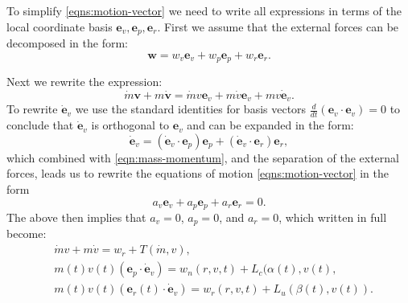\documentclass{article}
\renewcommand{\vec}[1]{\boldsymbol{#1}}
\begin{document}
To simplify \eqref{eqns:motion-vector} we need to write all expressions in terms of the local coordinate basis $\vec e_v, \vec e_p, \vec e_r$. First we assume that the external forces can be decomposed in the form:
\[
\vec w = w_v \vec e_v + w_p \vec e_p + w_r \vec e_r.
\]

Next we rewrite the expression:
\begin{equation} \label{eqn:mass-momentum}
    \dot{m}\vec{v} + m \dot{\vec{v}} = \dot{m}v \vec{e}_v + m \dot v \vec{e}_v + m v \dot{\vec{e}}_v.
\end{equation}
To rewrite $\dot{\vec{e}}_v$ we use the standard identities for basis vectors $\frac{d}{dt}(\vec{e}_v \cdot \vec{e}_v)=0$
to conclude that $\dot{\vec{e}}_v$ is orthogonal to ${\vec{e}}_v$ and can be expanded in the form:
\[
\dot{\vec{e}}_v =  (\dot{\vec{e}}_v \cdot \vec{e}_p)\vec{e}_p + (\dot{\vec{e}}_v \cdot \vec{e}_r)\vec{e}_r,
\] 
which combined with \eqref{eqn:mass-momentum}, and the separation of the external forces, leads us to rewrite the equations of motion \eqref{eqns:motion-vector} in the form 
\[ 
a_v \vec e_v + a_p \vec e_p + a_r \vec e_r = 0.
\]
The above then implies that $a_v =0$, $a_p =0$, and $a_r =0$, which written in full become:
\begin{align} \label{eqn:thrust-momentum}
    &  \dot{m} v + m \dot v = w_r + T(\dot{m},v),
    \\
    \label{eqn:turn-momentum}
    &  m(t) v(t)({\vec{e}}_p \cdot \dot{\vec{e}}_v) = w_n(r,v,t) + L_c(\alpha(t),v(t),
    \\
    \label{eqn:lift-momentum}
    & m(t) v(t)({\vec{e}_r}(t) \cdot \dot{\vec{e}}_v)=w_r(r,v,t)+L_u(\beta(t),v(t)).
\end{align}
\end{document}

